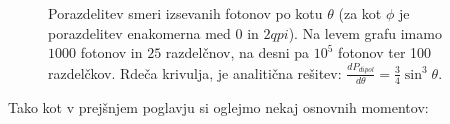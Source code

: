 \documentclass[slovene,11pt,a4paper]{article}
\numberwithin{equation}{section} %
\numberwithin{figure}{section} %
\numberwithin{table}{section} %
\begin{document}
\begin{figure}[h]
\noindent{}
\caption{Porazdelitev  smeri izsevanih fotonov po kotu $\theta$ (za kot $\phi$ je porazdelitev enakomerna med $0$ in $2qpi$). Na levem grafu imamo $1000$ fotonov in $25$ razdelčnov, na desni pa $10^{5}$ fotonov ter 100 razdelčkov. Rdeča krivulja, je analitična rešitev: $\frac{d P_{dipol}}{d \theta}=\frac{3}{4} \sin^3 \theta$.}
\end{figure}
Tako kot v prejšnjem poglavju si oglejmo nekaj osnovnih momentov:
\end{document}
